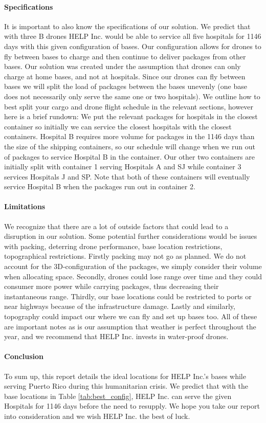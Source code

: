 \paragraph{Specifications} It is important to also know the specifications of our solution. We predict that with three B drones HELP Inc. would be able to service all five hospitals for 1146 days with this given configuration of bases. Our configuration allows for drones to fly between bases to charge and then continue to deliver packages from other bases. Our solution was created under the assumption that drones can only charge at home bases, and not at hospitals. Since our drones can fly between bases we will split the load of packages between the bases unevenly (one base does not necessarily only serve the same one or two hospitals). We outline how to best split your cargo and drone flight schedule in the relevant sections, however here is a brief rundown: We put the relevant packages for hospitals in the closest container so initially we can service the closest hospitals with the closest containers. Hospital B requires more volume for packages in the 1146 days than the size of the shipping containers, so our schedule will change when we run out of packages to service Hospital B in the container. Our other two containers are initially split with container 1 serving Hospitals A and SJ while container 3 services Hospitals J and SP. Note that both of these containers will eventually service Hospital B when the packages run out in container 2. 
\paragraph{Limitations} We recognize that there are a lot of outside factors that could lead to a disruption in our solution. Some potential further considerations would be issues with packing, deterring drone performance, base location restrictions, topographical restrictions. Firstly packing may not go as planned. We do not account for the 3D-configuration of the packages, we simply consider their volume when allocating space. Secondly, drones could lose range over time and they could consumer more power while carrying packages, thus decreasing their instantaneous range. Thirdly, our base locations could be restricted to ports or near highways because of the infrastructure damage. Lastly and similarly, topography could impact our where we can fly and set up bases too. All of these are important notes as is our assumption that weather is perfect throughout the year, and we recommend that HELP Inc. invests in water-proof drones.
\paragraph{Conclusion} To sum up, this report details the ideal locations for HELP Inc.'s bases while serving Puerto Rico during this humanitarian crisis. We predict that with the base locations in Table \ref{tab:best_config}, HELP Inc. can serve the given Hospitals for 1146 days before the need to resupply. We hope you take our report into consideration and we wish HELP Inc. the best of luck.